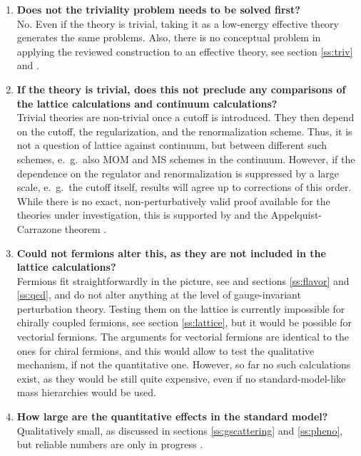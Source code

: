 \documentclass[final,twoside,12pt]{article}
\newcommand*{\1}{1\!\!\!\bot}
\begin{document}
\begin{enumerate}
 \item {\bf Does not the triviality problem needs to be solved first?}\\
 No. Even if the theory is trivial, taking it as a low-energy effective theory generates the same problems. Also, there is no conceptual problem in applying the reviewed construction to an effective theory, see section \ref{ss:triv} and \cite{Hasenfratz:1986za,ZinnJustin:2002ru}.
 
 \item {\bf If the theory is trivial, does this not preclude any comparisons of the lattice calculations and continuum calculations?}\\
 Trivial theories are non-trivial once a cutoff is introduced. They then depend on the cutoff, the regularization, and the renormalization scheme. Thus, it is not a question of lattice against continuum, but between different such schemes, e.\ g.\ also MOM and MS schemes in the continuum. However, if the dependence on the regulator and renormalization is suppressed by a large scale, e.\ g.\ the cutoff itself, results will agree up to corrections of this order. While there is no exact, non-perturbatively valid proof available for the theories under investigation, this is supported by \cite{Hasenfratz:1986za} and the Appelquist-Carrazone theorem \cite{BeiglboCk:2006lfa}.
 
 \item {\bf Could not fermions alter this, as they are not included in the lattice calculations?}\\
 Fermions fit straightforwardly in the picture, see \cite{Frohlich:1981yi} and sections \ref{ss:flavor} and \ref{ss:qcd}, and do not alter anything at the level of gauge-invariant perturbation theory. Testing them on the lattice is currently impossible for chirally coupled fermions, see section \ref{ss:lattice}, but it would be possible for vectorial fermions. The arguments for vectorial fermions are identical to the ones for chiral fermions, and this would allow to test the qualitative mechanism, if not the quantitative one. However, so far no such calculations exist, as they would be still quite expensive, even if no standard-model-like mass hierarchies would be used.
 
 \item {\bf How large are the quantitative effects in the standard model?}\\
 Qualitatively small, as discussed in sections \ref{ss:gscattering} and \ref{ss:pheno}, but reliable numbers are only in progress \cite{Egger:2017tkd,Maas:unpublished,Raubitzek:unpublished,Fernbach:unpublished}.
 

\end{enumerate}
\end{document}

